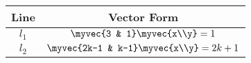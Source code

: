 \begin{tabular}{|c|c|} 
  \hline
  Line & Vector Form \\ 
  \hline
  $l_1$ & $ \myvec{3 & 1} \myvec{x\\y} = 1 $ \\ 
  \hline 
  $l_2$ & $ \myvec{2k-1 & k-1} \myvec{x\\y} = 2k+1 $  \\ 
  \hline
\end{tabular}

